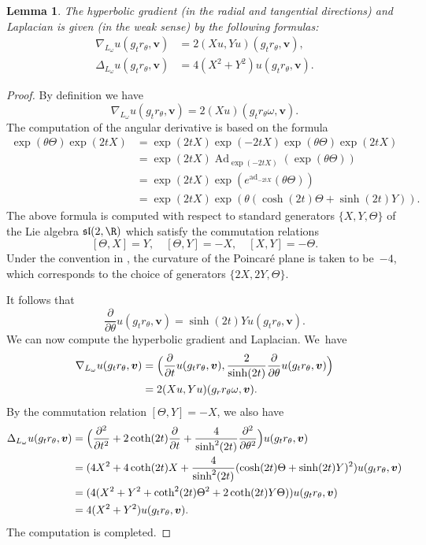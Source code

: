 \documentclass[JEP,XML,SOM,Unicode,published]{cedram}
\DeclareMathOperator{\Ad}{Ad}
\DeclareMathOperator{\ad}{ad}
\theoremstyle{plain}
\newtheorem{lemma}[thm]{Lemma}
\theoremstyle{definition}
\numberwithin{equation}{subsection}
\let\laplacian\Delta
\newcommand{\bfv}{\boldsymbol{v}}
\begin{document}
\begin{lemma} The hyperbolic gradient (in the radial and tangential directions) and Laplacian is given (in the weak sense) by the following formulas:
\[
\begin{aligned}
\nabla_{L_\omega} u(g_t r_\theta, \bfv) &= 2 \left (X u, Y u \right) (g_t r_\theta, \bfv), \\ \laplacian_{L_\omega} u(g_t r_\theta, \bfv) &= 4 (X^2 + Y^2)u (g_t r_\theta, \bfv).
\end{aligned}
\]
\end{lemma}
\begin{proof}
By definition we have
\[
\nabla_{L_\omega} u(g_t r_\theta, \bfv) = 2(Xu) (g_t r_\theta \omega, \bfv).
\]
The computation of the angular derivative
is based on the formula
\[
\begin{aligned}
\exp (\theta \Theta)\exp (2t X) &=
\exp (2 tX) \exp (-2tX) \exp (\theta \Theta) \exp(2tX) \\
&=
\exp (2tX) \Ad_{\exp (-2 tX)}(\exp (\theta \Theta)) \\
&=\exp (2tX) \exp (e^{\ad_{-2tX}} (\theta\Theta)) \\ &= \exp (2tX) \exp(\theta (\cosh (2t) \Theta + \sinh(2t) Y)).
\end{aligned}
\]
The above formula is computed with respect to standard generators $\{X,Y,\Theta\}$ of
the Lie algebra $\mathfrak{sl}(2,\R)$ which
satisfy the commutation relations
\[
[\Theta, X]=Y, \quad [\Theta, Y]=-X, \quad [X,Y] = -\Theta.
\]
Under the convention in \cite{For02}, the curvature of the Poincaré plane is taken to be~$-4$, which corresponds to the choice of generators $\{2X, 2Y, \Theta\}$.

It follows that
\[
\frac{\partial}{\partial \theta} u(g_t r_\theta, \bfv) = \sinh(2t) Y u(g_t r_\theta, \bfv).
\]
We can now compute the hyperbolic gradient and Laplacian. We~have
\[
\begin{aligned}
\nabla_{L_\omega} u(g_t r_\theta, \bfv) &=
\Bigl(\frac{\partial}{\partial t } u(g_t r_\theta, \bfv),
\frac{2}{\sinh(2t)} \frac{\partial}{\partial \theta} u(g_t r_\theta, \bfv)\Bigr)
\\&= 2 (Xu, Y u) (g_rr_\theta \omega,\bfv).
\end{aligned}
\]
By the commutation relation $[\Theta, Y]=-X$, we also have
\[
\begin{aligned}
\laplacian_{L_\omega} u(g_t r_\theta, \bfv) &=\Bigl(
\frac{\partial^2}{\partial t^2} + 2\coth(2t)\frac{\partial}{\partial t}+\frac{4}{\sinh^2(2t)}\frac{\partial^2}{\partial \theta^2}\Bigr) u(g_t r_\theta, \bfv) \\
& = (4 X^2 + 4\coth(2t)X + \frac{4}{\sinh^2(2t)} (\cosh(2t) \Theta + \sinh(2t) Y)^2)u(g_t r_\theta, \bfv)
\\
& = (4 (X^2 + Y^2 + \coth^2(2t)\Theta^2 + 2 \coth (2t) Y \Theta))u(g_t r_\theta, \bfv)
\\
& = 4 (X^2 + Y^2)u(g_t r_\theta,\bfv).
\end{aligned}
\]
The computation is completed.
\end{proof}
\end{document}
